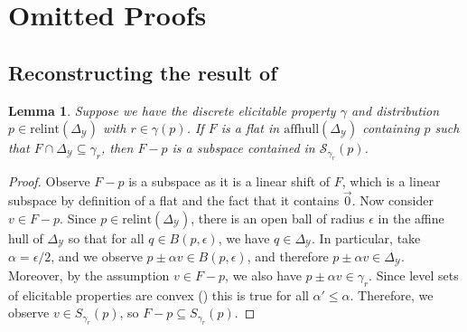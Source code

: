 \documentclass{article}
\newcommand{\Comments}{1}
\newcommand{\mynote}[2]{\ifnum\Comments=1\textcolor{#1}{#2}\fi}
\newcommand{\raf}[1]{\mynote{green!80!blue}{[RF: #1]}}
\newcommand{\simplex}{\Delta_\Y}
\newcommand{\relint}[1]{\mathrm{relint}(#1)}
\newcommand{\affhull}{\mathrm{affhull}}
\newcommand{\Sc}{\mathcal{S}}  %
\newcommand{\Y}{\mathcal{Y}}
\newtheorem{lemma}{Lemma}
\begin{document}
\section{Omitted Proofs}\label{app:omitted-proofs}

\subsection{Reconstructing the result of~\citet[Theorem 16]{ramaswamy2016convex}}
\begin{lemma}\label{lem:feas-sub-is-a-flat}
	Suppose we have the discrete elicitable property $\gamma$ and distribution $p \in \relint{\simplex}$ with $r \in \gamma(p)$.
	If $F$ is a flat in $\affhull(\simplex)$ containing $p$ such that $F \cap \simplex \subseteq \gamma_r$, then $F - p$ is a subspace contained in $\Sc_{\gamma_r}(p)$.
\end{lemma}
\begin{proof}
	Observe $F-p$ is a subspace as it is a linear shift of $F$, which is a linear subspace by definition of a flat and the fact that it contains $\vec 0$.
	Now consider $v \in F - p$.
	Since $p \in \relint{\simplex}$, there is an open ball of radius $\epsilon$ in the affine hull of $\simplex$ so that for all $q \in B(p, \epsilon)$, we have $q \in \simplex$.
	In particular, take $\alpha = \epsilon / 2$, and we observe $p \pm \alpha v \in B(p, \epsilon)$, and therefore $p \pm \alpha v \in \simplex$.
	Moreover, by the assumption $v \in F - p$, we also have $p \pm \alpha v \in \gamma_r$. 
	Since level sets of elicitable properties are convex (\citep{lambert2009eliciting}) this is true for all $\alpha' \leq \alpha$.
	Therefore, we observe $v \in S_{\gamma_r}(p)$, so $F-p \subseteq S_{\gamma_r}(p)$.
\end{proof}
\end{document}

